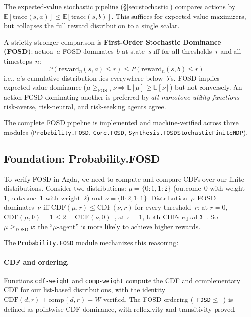 \documentclass[9pt,a4paper]{article}
\theoremstyle{plain}
\theoremstyle{definition}
\theoremstyle{remark}
\begin{document}
The expected-value stochastic pipeline (\S\ref{sec:stochastic}) compares actions by $\mathbb{E}[\text{trace}(s, a)] \le \mathbb{E}[\text{trace}(s, b)]$.  This suffices for expected-value maximizers, but collapses the full reward distribution to a single scalar.

A strictly stronger comparison is \textbf{First-Order Stochastic Dominance (FOSD)}: action~$a$ FOSD-dominates~$b$ at state~$s$ iff for all thresholds~$r$ and all timesteps~$n$:
\[
P(\text{reward}_n(s,a) \le r) \le P(\text{reward}_n(s,b) \le r)
\]
i.e., $a$'s cumulative distribution lies everywhere below~$b$'s.  FOSD implies expected-value dominance ($\mu \ge_\text{FOSD} \nu \Rightarrow \mathbb{E}[\mu] \ge \mathbb{E}[\nu]$) but not conversely.  An action FOSD-dominating another is preferred by \emph{all monotone utility functions}---risk-averse, risk-neutral, and risk-seeking agents agree.

The complete FOSD pipeline is implemented and machine-verified across three modules (\texttt{Probability.FOSD}, \texttt{Core.FOSD}, \texttt{Synthesis.FOSDStochasticFiniteMDP}).

\subsection{Foundation: Probability.FOSD}

To verify FOSD in Agda, we need to compute and compare CDFs over our finite distributions.  Consider two distributions: $\mu = \{0{:}1, 1{:}2\}$ (outcome~$0$ with weight~$1$, outcome~$1$ with weight~$2$) and $\nu = \{0{:}2, 1{:}1\}$.  Distribution~$\mu$ FOSD-dominates~$\nu$ iff $\text{CDF}(\mu, r) \le \text{CDF}(\nu, r)$ for every threshold~$r$: at $r{=}0$, $\text{CDF}(\mu, 0) = 1 \le 2 = \text{CDF}(\nu, 0)$~\checkmark; at $r{=}1$, both CDFs equal $3$~\checkmark.  So $\mu \ge_\text{FOSD} \nu$: the ``$\mu$-agent'' is more likely to achieve higher rewards.

The \texttt{Probability.FOSD} module mechanizes this reasoning:

\paragraph{CDF and ordering.}
Functions \texttt{cdf-weight} and \texttt{comp-weight} compute the CDF and complementary CDF for our list-based distributions, with the identity $\text{CDF}(d,r) + \text{comp}(d,r) = W$ verified.  The FOSD ordering (\texttt{\_FOSD$\le$\_}) is defined as pointwise CDF dominance, with reflexivity and transitivity proved.
\end{document}
